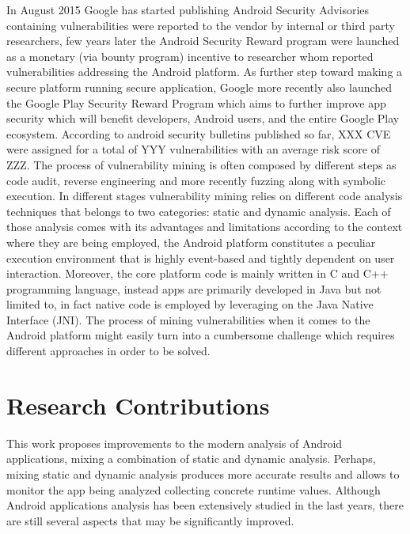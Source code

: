 In August 2015 Google has started publishing Android Security Advisories containing vulnerabilities were reported to the vendor by internal or third party researchers, few years later the Android Security Reward program were launched as a monetary (via bounty program) incentive to researcher whom reported vulnerabilities addressing the Android platform. As further step toward making a secure platform running secure application, Google more recently also launched the Google Play Security Reward Program which aims to further improve app security which will benefit developers, Android users, and the entire Google Play ecosystem. According to android security bulletins published so far, XXX CVE were assigned for a total of YYY vulnerabilities with an average risk score of ZZZ.
The process of vulnerability mining is often composed by different steps as code audit, reverse engineering and more recently fuzzing along with symbolic execution. In different stages vulnerability mining relies on different code analysis techniques that belongs to two categories: static and dynamic analysis. Each of those analysis comes with its advantages and limitations according to the context where they are being employed, the Android platform constitutes a peculiar execution environment that is highly event-based and tightly dependent on user interaction. Moreover, the core platform code is mainly written in C and C++ programming language, instead apps are primarily developed in Java but not limited to, in fact native code is employed by leveraging on the Java Native Interface (JNI). The process of mining vulnerabilities when it comes to the Android platform might easily turn into a cumbersome challenge which requires different approaches in order to be solved.



\section{Research Contributions}

This work proposes improvements to the modern analysis of Android applications, mixing a combination of static and dynamic analysis. Perhaps, mixing static and dynamic analysis produces more accurate results and allows to monitor the app being analyzed collecting concrete runtime values. Although Android applications analysis has been extensively studied in the last years, there are still several aspects that may be significantly improved. 


